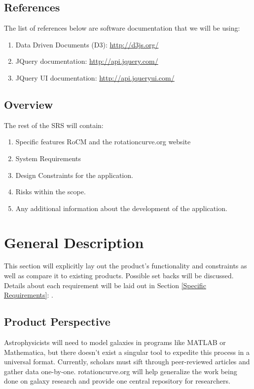 \documentclass[titlepage]{article}
\begin{document}
\subsection{References}
The list of references below are software documentation that we will be using:
\begin{enumerate}
	\item Data Driven Documents (D3): \href{http://d3js.org/}{\color{blue} http://d3js.org/}
	\item JQuery documentation: \href{http://api.jquery.com/}{\color{blue} http://api.jquery.com/}
	\item JQuery UI documentation: \href{http://api.jqueryui.com/}{\color{blue} http://api.jqueryui.com/}
\end{enumerate}

\subsection{Overview}
The rest of the SRS will contain:
\begin{enumerate}
	\item Specific features RoCM and the rotationcurve.org website
	\item System Requirements
	\item Design Constraints for the application.
	\item Risks within the scope.
	\item Any additional information about the development of the application.
\end{enumerate}

\section{General Description}
This section will explicitly lay out the product's functionality and constraints as well as compare it to existing products. Possible set backs will be discussed. Details about each requirement will be laid out in Section \ref{Specific Requirements}: . 

\subsection{Product Perspective}
Astrophysicists will need to model galaxies in programs like MATLAB or Mathematica, but there doesn't exist a singular tool to expedite this process in a universal format. Currently, scholars must sift through peer-reviewed articles and gather data one-by-one. rotationcurve.org will help generalize the work being done on galaxy research and provide one central repository for researchers.
\end{document}
